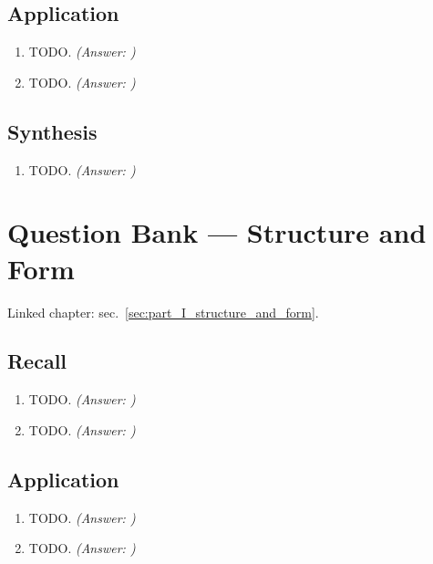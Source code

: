 \documentclass[
]{article}
\theoremstyle{plain}
\theoremstyle{definition}
\begin{document}
\subsection{Application}\label{application-4}

\begin{enumerate}
\def\labelenumi{\arabic{enumi}.}
\setcounter{enumi}{2}
\item
  TODO. \emph{(Answer: )}
\item
  TODO. \emph{(Answer: )}
\end{enumerate}

\subsection{Synthesis}\label{synthesis-4}

\begin{enumerate}
\def\labelenumi{\arabic{enumi}.}
\setcounter{enumi}{4}
\item
  TODO. \emph{(Answer: )}
\end{enumerate}

\newpage

\section{Question Bank --- Structure and
Form}\label{sec:q_part_I_structure_and_form}

Linked chapter: sec.~\ref{sec:part_I_structure_and_form}.

\subsection{Recall}\label{recall-5}

\begin{enumerate}
\def\labelenumi{\arabic{enumi}.}
\item
  TODO. \emph{(Answer: )}
\item
  TODO. \emph{(Answer: )}
\end{enumerate}

\subsection{Application}\label{application-5}

\begin{enumerate}
\def\labelenumi{\arabic{enumi}.}
\setcounter{enumi}{2}
\item
  TODO. \emph{(Answer: )}
\item
  TODO. \emph{(Answer: )}
\end{enumerate}
\end{document}
